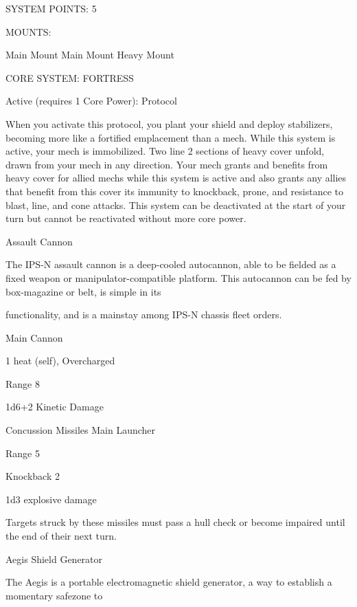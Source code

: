                                                SYSTEM POINTS: 5 

                                                    MOUNTS: 

  Main Mount                         Main Mount                              Heavy Mount 

                                          CORE SYSTEM: FORTRESS 

  Active (requires 1 Core Power):  
  Protocol
 
  When you activate this protocol, you plant your shield and deploy stabilizers, becoming more like a  
  fortified emplacement than a mech. While this system is active, your mech is immobilized. Two line 2  
  sections of heavy cover unfold, drawn from your mech in any direction. Your mech grants and benefits  
  from heavy cover for allied mechs while this system is active and also grants any allies that benefit from  
  this cover its immunity to knockback, prone, and resistance to blast, line, and cone attacks. This  
  system can be deactivated at the start of your turn but cannot be reactivated without more core power. 

Assault Cannon  

The IPS-N assault cannon is a deep-cooled autocannon, able to be fielded as a fixed weapon or  
manipulator-compatible platform. This autocannon can be fed by box-magazine or belt, is simple in its  

functionality, and is a mainstay among IPS-N chassis fleet orders.   

Main Cannon
 
1 heat (self), Overcharged
 
Range 8
 
1d6+2 Kinetic Damage
 

                                                                                                                


Concussion Missiles   
Main Launcher
 
Range 5
 
Knockback 2
 
1d3 explosive damage
 
Targets struck by these missiles must pass a hull check or become impaired until the end of their  
next turn.
 

Aegis Shield Generator  

The Aegis is a portable electromagnetic shield generator, a way to establish a momentary safezone to  

